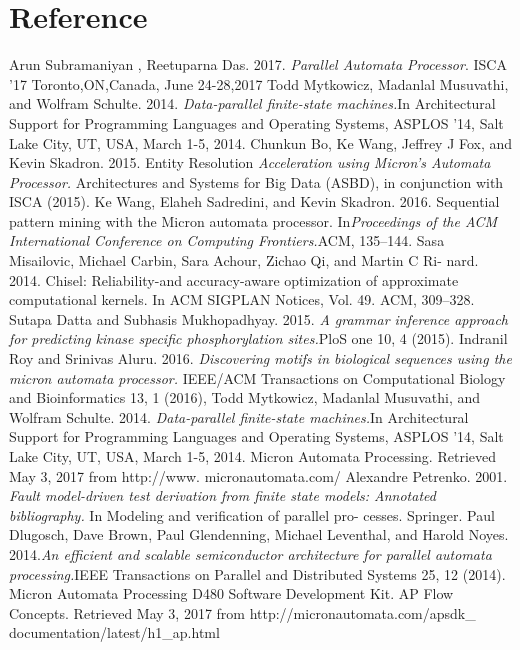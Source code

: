 \section{Reference}
\begin{thebibliography}{9}
    Arun Subramaniyan , Reetuparna Das. 2017.
    \textit{Parallel Automata Processor}. 
    ISCA ’17 Toronto,ON,Canada, June 24-28,2017
    Todd Mytkowicz, Madanlal Musuvathi, and Wolfram Schulte. 2014.
\textit{Data-parallel
finite-state machines.}In Architectural Support for Programming Languages and
Operating Systems, ASPLOS ’14, Salt Lake City, UT, USA, March 1-5, 2014.
    Chunkun Bo, Ke Wang, Jeffrey J Fox, and Kevin Skadron. 2015. Entity Resolution
    \textit{Acceleration using Micron’s Automata Processor.}
    Architectures and Systems for
    Big Data (ASBD), in conjunction with ISCA (2015).
    Ke Wang, Elaheh Sadredini, and Kevin Skadron. 2016. Sequential pattern mining
with the Micron automata processor. In\textit{Proceedings of the ACM International
Conference on Computing Frontiers.}ACM, 135–144.
Sasa Misailovic, Michael Carbin, Sara Achour, Zichao Qi, and Martin C Ri-
nard. 2014. Chisel: Reliability-and accuracy-aware optimization of approximate
computational kernels. In ACM SIGPLAN Notices, Vol. 49. ACM, 309–328.
Sutapa Datta and Subhasis Mukhopadhyay. 2015. \textit{A grammar inference approach
for predicting kinase specific phosphorylation sites.}PloS one 10, 4 (2015).
Indranil Roy and Srinivas Aluru. 2016. \textit{Discovering motifs in biological sequences
using the micron automata processor.}
IEEE/ACM Transactions on Computational
Biology and Bioinformatics 13, 1 (2016),
Todd Mytkowicz, Madanlal Musuvathi, and Wolfram Schulte. 2014.
\textit{Data-parallel
finite-state machines.}In Architectural Support for Programming Languages and
Operating Systems, ASPLOS ’14, Salt Lake City, UT, USA, March 1-5, 2014.
Micron Automata Processing. Retrieved May 3, 2017 from http://www.
micronautomata.com/
Alexandre Petrenko. 2001.
\textit{Fault model-driven test derivation from finite state
models: Annotated bibliography.}
In Modeling and verification of parallel pro-
cesses. Springer.
Paul Dlugosch, Dave Brown, Paul Glendenning, Michael Leventhal, and Harold
Noyes. 2014.\textit{An efficient and scalable semiconductor architecture for parallel
automata processing.}IEEE Transactions on Parallel and Distributed Systems 25,
12 (2014).
Micron Automata Processing D480 Software Development Kit. AP Flow
Concepts. Retrieved May 3, 2017 from http://micronautomata.com/apsdk\_
documentation/latest/h1\_ap.html
    



\end{thebibliography}